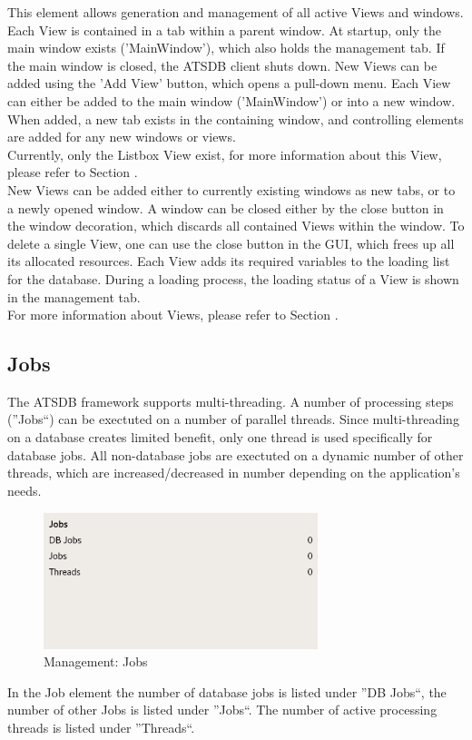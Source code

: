 This element allows generation and management of all active Views and windows. Each View is contained
in a tab within a parent window.  At startup, only the main window exists ('MainWindow'), which also holds
the management tab. If the main window is closed, the ATSDB client shuts down. New Views can be added using the 'Add View' button, which opens a pull-down menu. Each View can either be added to the main window ('MainWindow') or into a new window. When added, a new tab exists in the containing window, and controlling elements are added for any new
windows or views. \\

Currently, only the Listbox View exist, for more information about this View, please refer to Section .\\

New Views can be added either to currently existing windows as new tabs, or to a newly opened window. A window can be closed either by the close button in the window decoration, which discards all contained Views within the window.  To delete a single View, one can use the close button in the GUI, which frees up all its allocated resources. Each View adds its required variables to the loading list for the database.  During a loading process, the loading status  of a View is shown in the management tab.\\

For more information about Views, please refer to Section .

\subsection{Jobs}

The ATSDB framework supports multi-threading. A number of processing steps (''Jobs``) can be exectuted on a number of parallel threads. Since multi-threading on a database creates limited benefit, only one thread is used specifically for database jobs. All non-database jobs are exectuted on a dynamic number of other threads, which are increased/decreased in number depending on the application's needs. 

\begin{figure}[H]
  \center
    \includegraphics[width=8cm,frame]{../screenshots/management_jobs.png}
  \caption{Management: Jobs}
  \label{fig:management_jobs}
\end{figure}

In the Job element the number of database jobs is listed under ''DB Jobs``, the number of other Jobs is listed under ''Jobs``. The number of active processing threads is listed under ''Threads``.
 
